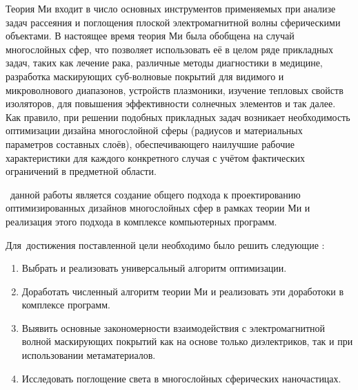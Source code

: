 {\actuality} Теория Ми входит в число основных инструментов
применяемых при анализе задач рассеяния и поглощения плоской
электромагнитной волны сферическими объектами.  В настоящее время
теория Ми была обобщена на случай многослойных сфер, что позволяет
использовать её в целом ряде прикладных задач, таких как лечение рака,
различные методы диагностики в медицине, разработка маскирующих
суб-волновые покрытий для видимого и микроволнового диапазонов,
устройств плазмоники, изучение тепловых свойств изоляторов, для
повышения эффективности солнечных элементов и так далее.  Как правило,
при решении подобных прикладных задач возникает необходимость
оптимизации дизайна многослойной сферы (радиусов и материальных
параметров составных слоёв), обеспечивающего наилучшие рабочие
характеристики для каждого конкретного случая с учётом фактических
ограничений в предметной области.

\aim\ данной работы является создание общего подхода к проектированию
оптимизированных дизайнов многослойных сфер в рамках теории Ми и
реализация этого подхода в комплексе компьютерных программ.

Для~достижения поставленной цели необходимо было решить следующие {\tasks}:
\begin{enumerate}
  \item Выбрать и реализовать универсальный алгоритм оптимизации.
  \item Доработать численный алгоритм теории Ми и реализовать эти
    доработоки в комплексе программ.
  \item Выявить основные закономерности взаимодействия с
    электромагнитной волной маскирующих покрытий как на основе только
    диэлектриков, так и при использовании метаматериалов.
  \item Исследовать поглощение света в многослойных сферических наночастицах.
\end{enumerate}

